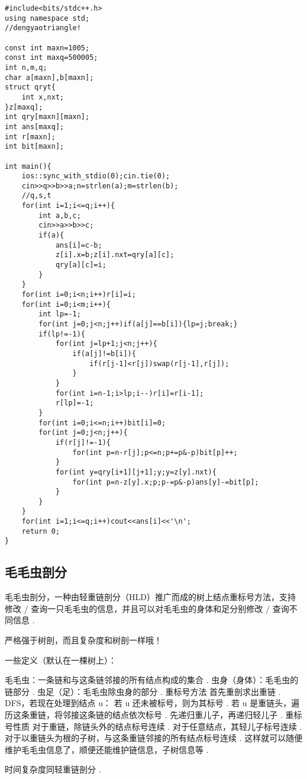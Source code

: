 \documentclass[12pt]{ctexart}
\begin{document}
\begin{lstlisting}
#include<bits/stdc++.h>
using namespace std;
//dengyaotriangle!

const int maxn=1005;
const int maxq=500005;
int n,m,q;
char a[maxn],b[maxn];
struct qryt{
    int x,nxt;
}z[maxq];
int qry[maxn][maxn];
int ans[maxq];
int r[maxn];
int bit[maxn];

int main(){
    ios::sync_with_stdio(0);cin.tie(0);
    cin>>q>>b>>a;n=strlen(a);m=strlen(b);
	//q,s,t
    for(int i=1;i<=q;i++){
        int a,b,c;
        cin>>a>>b>>c;
        if(a){
            ans[i]=c-b;
            z[i].x=b;z[i].nxt=qry[a][c];
            qry[a][c]=i;
        }
    }    
    for(int i=0;i<n;i++)r[i]=i;
    for(int i=0;i<m;i++){
        int lp=-1;
        for(int j=0;j<n;j++)if(a[j]==b[i]){lp=j;break;}
        if(lp!=-1){
            for(int j=lp+1;j<n;j++){
                if(a[j]!=b[i]){
                    if(r[j-1]<r[j])swap(r[j-1],r[j]);
                }
            }
            for(int i=n-1;i>lp;i--)r[i]=r[i-1];
            r[lp]=-1;
        }
        for(int i=0;i<=n;i++)bit[i]=0;
        for(int j=0;j<n;j++){
            if(r[j]!=-1){
                for(int p=n-r[j];p<=n;p+=p&-p)bit[p]++;
            }
            for(int y=qry[i+1][j+1];y;y=z[y].nxt){
                for(int p=n-z[y].x;p;p-=p&-p)ans[y]-=bit[p];
            }
        }
    }
    for(int i=1;i<=q;i++)cout<<ans[i]<<'\n';
    return 0;
}
\end{lstlisting}

\subsection{毛毛虫剖分}
毛毛虫剖分，一种由轻重链剖分（HLD）推广而成的树上结点重标号方法，支持修改 / 查询一只毛毛虫的信息，并且可以对毛毛虫的身体和足分别修改 / 查询不同信息 .

严格强于树剖，而且复杂度和树剖一样哦！

一些定义（默认在一棵树上）：

毛毛虫：一条链和与这条链邻接的所有结点构成的集合 .
虫身（身体）：毛毛虫的链部分 .
虫足（足）：毛毛虫除虫身的部分 .
重标号方法
首先重剖求出重链 .
DFS，若现在处理到结点 u：
若 u 还未被标号，则为其标号 .
若 u 是重链头，遍历这条重链，将邻接这条链的结点依次标号 .
先递归重儿子，再递归轻儿子 .
重标号性质
对于重链，除链头外的结点标号连续 .
对于任意结点，其轻儿子标号连续 .
对于以重链头为根的子树，与这条重链邻接的所有结点标号连续 .
这样就可以随便维护毛毛虫信息了，顺便还能维护链信息，子树信息等 .

时间复杂度同轻重链剖分 .
\end{document}
